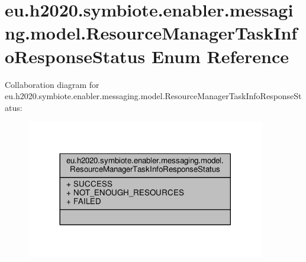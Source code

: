 \hypertarget{enumeu_1_1h2020_1_1symbiote_1_1enabler_1_1messaging_1_1model_1_1ResourceManagerTaskInfoResponseStatus}{}\section{eu.\+h2020.\+symbiote.\+enabler.\+messaging.\+model.\+Resource\+Manager\+Task\+Info\+Response\+Status Enum Reference}
\label{enumeu_1_1h2020_1_1symbiote_1_1enabler_1_1messaging_1_1model_1_1ResourceManagerTaskInfoResponseStatus}


Collaboration diagram for eu.\+h2020.\+symbiote.\+enabler.\+messaging.\+model.\+Resource\+Manager\+Task\+Info\+Response\+Status\+:
\nopagebreak
\begin{figure}[H]
\begin{center}
\leavevmode
\includegraphics[width=296pt]{enumeu_1_1h2020_1_1symbiote_1_1enabler_1_1messaging_1_1model_1_1ResourceManagerTaskInfoResponseStatus__coll__graph}
\end{center}
\end{figure}
